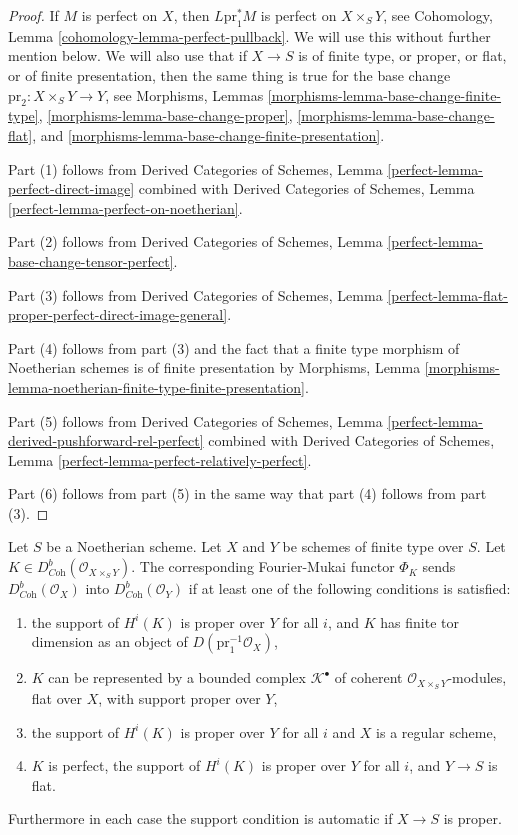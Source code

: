 \begin{proof}
If $M$ is perfect on $X$, then $L\text{pr}_1^*M$
is perfect on $X \times_S Y$, see
Cohomology, Lemma \ref{cohomology-lemma-perfect-pullback}.
We will use this without further mention below.
We will also use that if $X \to S$ is of finite type, or proper, or
flat, or of finite presentation, then the same thing is true for
the base change $\text{pr}_2 : X \times_S Y \to Y$, see
Morphisms, Lemmas
\ref{morphisms-lemma-base-change-finite-type},
\ref{morphisms-lemma-base-change-proper},
\ref{morphisms-lemma-base-change-flat}, and
\ref{morphisms-lemma-base-change-finite-presentation}.

\medskip\noindent
Part (1) follows from
Derived Categories of Schemes, Lemma \ref{perfect-lemma-perfect-direct-image}
combined with
Derived Categories of Schemes, Lemma \ref{perfect-lemma-perfect-on-noetherian}.

\medskip\noindent
Part (2) follows from
Derived Categories of Schemes, Lemma
\ref{perfect-lemma-base-change-tensor-perfect}.

\medskip\noindent
Part (3) follows from
Derived Categories of Schemes, Lemma
\ref{perfect-lemma-flat-proper-perfect-direct-image-general}.

\medskip\noindent
Part (4) follows from part (3) and the fact that a finite type
morphism of Noetherian schemes is of finite presentation by Morphisms, Lemma
\ref{morphisms-lemma-noetherian-finite-type-finite-presentation}.

\medskip\noindent
Part (5) follows from
Derived Categories of Schemes, Lemma
\ref{perfect-lemma-derived-pushforward-rel-perfect} combined with
Derived Categories of Schemes, Lemma
\ref{perfect-lemma-perfect-relatively-perfect}.

\medskip\noindent
Part (6) follows from part (5) in the same way that part (4) follows from
part (3).
\end{proof}

\begin{lemma}
\label{lemma-fourier-mukai-Coh}
Let $S$ be a Noetherian scheme. Let $X$ and $Y$ be schemes of finite type
over $S$. Let $K \in D^b_{\textit{Coh}}(\mathcal{O}_{X \times_S Y})$.
The corresponding Fourier-Mukai functor $\Phi_K$ sends
$D^b_{\textit{Coh}}(\mathcal{O}_X)$ into $D^b_{\textit{Coh}}(\mathcal{O}_Y)$
if at least one of the following conditions is satisfied:
\begin{enumerate}
\item the support of $H^i(K)$ is proper over $Y$ for all $i$, and $K$
has finite tor dimension as an object of $D(\text{pr}_1^{-1}\mathcal{O}_X)$,
\item $K$ can be represented by a bounded complex $\mathcal{K}^\bullet$
of coherent $\mathcal{O}_{X \times_S Y}$-modules, flat over $X$, with support
proper over $Y$,
\item the support of $H^i(K)$ is proper over $Y$ for all $i$
and $X$ is a regular scheme,
\item $K$ is perfect, the support of $H^i(K)$ is proper over $Y$ for all $i$,
and $Y \to S$ is flat.
\end{enumerate}
Furthermore in each case the support condition is automatic
if $X \to S$ is proper.
\end{lemma}

